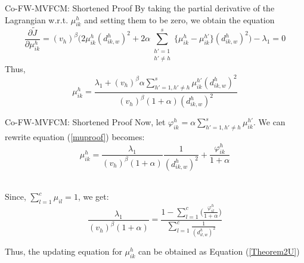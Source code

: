 \documentclass[compress,sky blue]{beamer}
\begin{document}
\begin{frame}{Co-FW-MVFCM: Shortened Proof}
By taking the partial derivative of the Lagrangian w.r.t. $\mu_{ik}^{h}$  and setting them to be zero, we obtain the equation  
\begin{equation}
\frac{\partial \tilde{J}}{\partial\mu_{ik}^{h}}=(v_{h})^{\beta}\bigg(2 \mu_{ik}^{h} (d_{ik,w}^{h})^{2} + 2 \alpha \sum_{\substack{h'= 1\\ h'\ne h}}^{s} \{ \mu_{ik}^{h}-\mu_{ik}^{h'} \} (d_{ik,w}^{h})^{2} \bigg) - \lambda_{1}=0
\end{equation}
Thus,
\begin{equation}
\mu_{ik}^{h}=\frac{\lambda_{1}+(v_{h})^{\beta} \alpha \sum_{h'=1,h'\neq h}^{s}  \mu_{ik}^{h'} (d_{ik,w}^{h})^{2}} { (v_{h})^{\beta} (1+\alpha) (d_{ik,w}^{h})^{2}}
\label{muproof}
\end{equation}
\end{frame}

\begin{frame}{Co-FW-MVFCM: Shortened Proof}
\vspace{-0.7cm}
Now, let $\varphi_{ik}^{h}=\alpha  \sum_{h'=1,h'\neq h}^{s}   \mu_{ik}^{h'}$. We can rewrite equation (\ref{muproof}) becomes: \\
\begin{equation}
\mu_{ik}^{h}=\frac{\lambda_{1}}{ (v_{h})^{\beta} (1+\alpha) } \frac{1}{ (d_{ik,w}^{h})^{2} } + \frac{\varphi_{ik}^{h}}{ 1+ \alpha }
\end{equation}

\\Since, $\sum_{l=1}^{c}\mu_{il}=1 $, we get: \\

\begin{equation}
\frac{\lambda_{1}} { (v_{h})^{\beta} (1+\alpha) } = \frac{1 - \sum_{l=1}^{c} \big( \frac{\varphi_{il}^{h}}{1+\alpha} \big ) } { \sum_{l=1}^{c} \frac{1}{(d_{il,w}^{h})^{2}} }
\end{equation}

Thus, the updating equation for $\mu_{ik}^{h}$ can be obtained as Equation (\ref{Theorem2U}) 

\end{frame}
\end{document}
